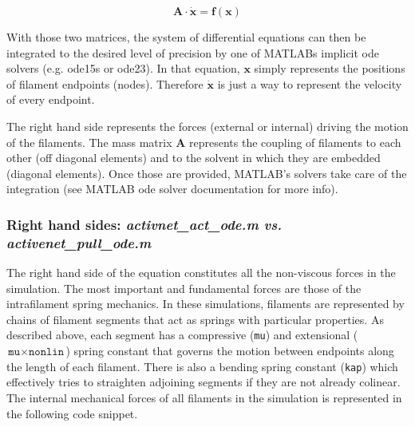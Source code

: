 \begin{equation}
\mathbf{A \cdot \dot x} = \mathbf{f(x)}
\end{equation}

With those two matrices, the system of differential equations can then be integrated to the desired level of precision by one of MATLABs implicit ode solvers (e.g. ode15s or ode23).  In that equation, $\mathbf{x}$ simply represents the positions of filament endpoints (nodes).  Therefore $\mathbf{\dot{x}}$ is just a way to represent the velocity of every endpoint.  

The right hand side represents the forces (external or internal) driving the motion of the filaments.  The mass matrix $\mathbf{A}$ represents the coupling of filaments to each other (off diagonal elements) and to the solvent in which they are embedded (diagonal elements).  Once those are provided, MATLAB's solvers take care of the integration (see MATLAB ode solver documentation for more info).


\subsubsection{Right hand sides: \textit{activnet\_act\_ode.m vs. activenet\_pull\_ode.m}}

The right hand side of the equation constitutes all the non-viscous forces in the simulation.  The most important and fundamental forces are those of the intrafilament spring mechanics.  In these simulations, filaments are represented by chains of filament segments that act as springs with particular properties.  As described above, each segment has a compressive (\texttt{mu}) and extensional ($\texttt{mu}\times\texttt{nonlin}$) spring constant that governs the motion between endpoints along the length of each filament.  There is also a bending spring constant (\texttt{kap}) which effectively tries to straighten adjoining segments if they are not already colinear.  The internal mechanical forces of all filaments in the simulation is represented in the following code snippet.

